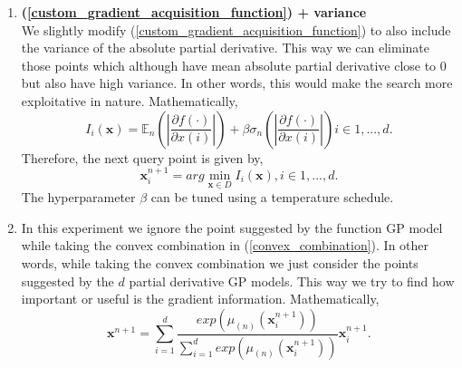 \documentclass{article}
\begin{document}
\begin{enumerate}
        \item
            \textbf {(\ref{custom_gradient_acquisition_function}) + variance} \\
            We slightly modify (\ref{custom_gradient_acquisition_function}) to also include the variance of the absolute partial derivative. This way we can
            eliminate those points which although have mean absolute partial derivative close to 0 but also have high variance. In other words, this would make
            the search more exploitative in nature. Mathematically,
            \begin{equation}
                I_{i}(\textbf {x}) = \mathbb{E}_{n} \left( \left |\frac{\partial f(\cdot)}{\partial x(i)} \right | \right ) +  \beta\sigma_{n} \left( \left |\frac{\partial f(\cdot)}{\partial x(i)} \right | \right )   i \in {1,...,d}.
                \label{custom_gradient_acquisition_function_plus_variance}
            \end{equation}
            Therefore, the next query point is given by,
            \begin{equation}
                \textbf{x}^{n+1}_{i} = arg \min_{\textbf{x} \in D} I_{i}(\textbf {x}), i \in {1,...,d}.
            \end{equation}
            The hyperparameter $\beta$ can be tuned using a temperature schedule.

        \item
            In this experiment we ignore the point suggested by the function GP model while taking the convex combination in (\ref{convex_combination}). In 
            other words, while taking the convex combination we just consider the points suggested by the $d$ partial derivative GP models. This way we try to
            find how important or useful is the gradient information. Mathematically,
            \begin{equation}
                \textbf {x}^{n+1} = \sum_{i=1}^{d} \frac {exp(\mu_{(n)}(\textbf{x}^{n+1}_{i}))}{\sum_{i=1}^{d} exp(\mu_{(n)}(\textbf{x}^{n+1}_{i}))} \textbf{x}^{n+1}_{i}.
                \label{convex_combination_4}
            \end{equation} 


\end{enumerate}
\end{document}
